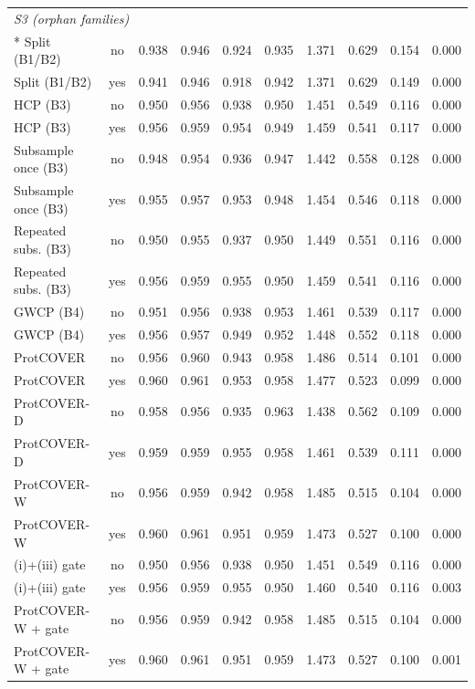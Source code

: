 \begin{longtable}{lccccccccc}
\midrule
\multicolumn{10}{l}{\emph{S3 (orphan families)}}\\*
Split (B1/B2) & no & 0.938 & 0.946 & 0.924 & 0.935 & 1.371 & 0.629 & 0.154 & 0.000 \\
Split (B1/B2) & yes & 0.941 & 0.946 & 0.918 & 0.942 & 1.371 & 0.629 & 0.149 & 0.000 \\
HCP (B3) & no & 0.950 & 0.956 & 0.938 & 0.950 & 1.451 & 0.549 & 0.116 & 0.000 \\
HCP (B3) & yes & 0.956 & 0.959 & 0.954 & 0.949 & 1.459 & 0.541 & 0.117 & 0.000 \\
Subsample once (B3) & no & 0.948 & 0.954 & 0.936 & 0.947 & 1.442 & 0.558 & 0.128 & 0.000 \\
Subsample once (B3) & yes & 0.955 & 0.957 & 0.953 & 0.948 & 1.454 & 0.546 & 0.118 & 0.000 \\
Repeated subs. (B3) & no & 0.950 & 0.955 & 0.937 & 0.950 & 1.449 & 0.551 & 0.116 & 0.000 \\
Repeated subs. (B3) & yes & 0.956 & 0.959 & 0.955 & 0.950 & 1.459 & 0.541 & 0.116 & 0.000 \\
GWCP (B4) & no & 0.951 & 0.956 & 0.938 & 0.953 & 1.461 & 0.539 & 0.117 & 0.000 \\
GWCP (B4) & yes & 0.956 & 0.957 & 0.949 & 0.952 & 1.448 & 0.552 & 0.118 & 0.000 \\
ProtCOVER & no & 0.956 & 0.960 & 0.943 & 0.958 & 1.486 & 0.514 & 0.101 & 0.000 \\
ProtCOVER & yes & 0.960 & 0.961 & 0.953 & 0.958 & 1.477 & 0.523 & 0.099 & 0.000 \\
ProtCOVER-D & no & 0.958 & 0.956 & 0.935 & 0.963 & 1.438 & 0.562 & 0.109 & 0.000 \\
ProtCOVER-D & yes & 0.959 & 0.959 & 0.955 & 0.958 & 1.461 & 0.539 & 0.111 & 0.000 \\
ProtCOVER-W & no & 0.956 & 0.959 & 0.942 & 0.958 & 1.485 & 0.515 & 0.104 & 0.000 \\
ProtCOVER-W & yes & 0.960 & 0.961 & 0.951 & 0.959 & 1.473 & 0.527 & 0.100 & 0.000 \\
(i)+(iii) gate & no & 0.950 & 0.956 & 0.938 & 0.950 & 1.451 & 0.549 & 0.116 & 0.000 \\
(i)+(iii) gate & yes & 0.956 & 0.959 & 0.955 & 0.950 & 1.460 & 0.540 & 0.116 & 0.003 \\
ProtCOVER-W + gate & no & 0.956 & 0.959 & 0.942 & 0.958 & 1.485 & 0.515 & 0.104 & 0.000 \\
ProtCOVER-W + gate & yes & 0.960 & 0.961 & 0.951 & 0.959 & 1.473 & 0.527 & 0.100 & 0.001 \\

\end{longtable}
